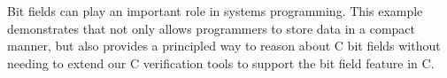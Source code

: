 % 




\noindent Bit fields can play an important role in systems programming. This example demonstrates that 
\dargent not only allows programmers to store data in a compact manner, but also provides a 
principled way to reason about C bit fields without needing to extend our C verification tools
to support the bit field feature in C.


